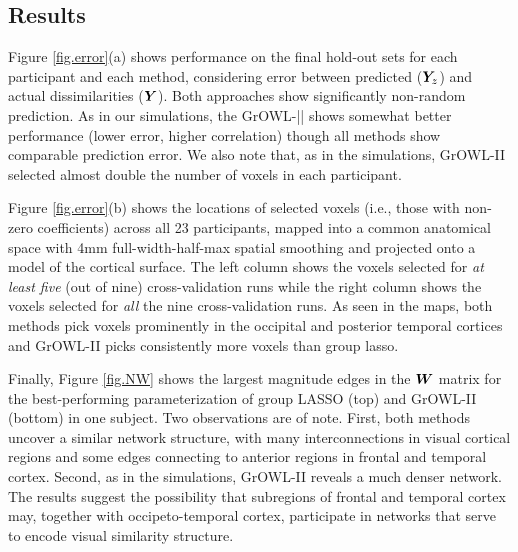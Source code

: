\subsection{Results}

Figure \ref{fig.error}(a) shows performance on the final hold-out sets for each participant and each method, considering error between predicted ($\boldsymbol{Y}_z$) and actual dissimilarities ($\boldsymbol{Y}$). Both approaches show significantly non-random prediction. As in our simulations, the GrOWL-|| shows somewhat better performance (lower error, higher correlation) though all methods show comparable prediction error. We also note that, as in the simulations, GrOWL-II selected almost double the number of voxels in each participant. 

Figure \ref{fig.error}(b) shows the locations of selected voxels (i.e., those with non-zero coefficients) across all 23 participants, mapped into a common anatomical space with 4mm full-width-half-max spatial smoothing and projected onto a model of the cortical surface. The left column shows the voxels selected for \textit{at least five} (out of nine) cross-validation runs while the right column shows the voxels selected for \textit{all} the nine cross-validation runs. As seen in the maps, both methods pick voxels prominently in the occipital and posterior temporal cortices and GrOWL-II picks consistently more voxels than group lasso.

Finally, Figure \ref{fig.NW} shows the largest magnitude edges in the $\boldsymbol{W}$ matrix for the best-performing parameterization of group LASSO (top) and GrOWL-II (bottom) in one subject. Two observations are of note. First, both methods uncover a similar network structure, with many interconnections in visual cortical regions and some edges connecting to anterior regions in frontal and temporal cortex. Second, as in the simulations, GrOWL-II reveals a much denser network. The results suggest the possibility that subregions of frontal and temporal cortex may, together with occipeto-temporal cortex, participate in networks that serve to encode visual similarity structure.

